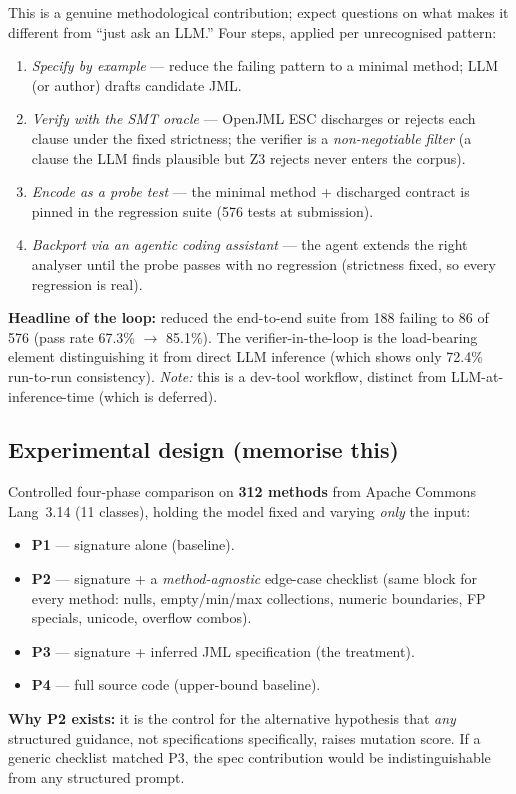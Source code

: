 \documentclass[11pt]{article}
\begin{document}
This is a genuine methodological contribution; expect questions on what makes
it different from ``just ask an LLM.'' Four steps, applied per unrecognised
pattern:
\begin{enumerate}[leftmargin=1.6em,itemsep=0.05em]
  \item \emph{Specify by example} --- reduce the failing pattern to a minimal
        method; LLM (or author) drafts candidate JML.
  \item \emph{Verify with the SMT oracle} --- OpenJML ESC discharges or
        rejects each clause under the fixed strictness; the verifier is a
        \emph{non-negotiable filter} (a clause the LLM finds plausible but Z3
        rejects never enters the corpus).
  \item \emph{Encode as a probe test} --- the minimal method + discharged
        contract is pinned in the regression suite (576 tests at submission).
  \item \emph{Backport via an agentic coding assistant} --- the agent extends
        the right analyser until the probe passes with no regression (strictness
        fixed, so every regression is real).
\end{enumerate}
\textbf{Headline of the loop:} reduced the end-to-end suite from 188 failing
to 86 of 576 (pass rate 67.3\% $\to$ 85.1\%). The verifier-in-the-loop is the
load-bearing element distinguishing it from direct LLM inference (which shows
only 72.4\% run-to-run consistency). \emph{Note:} this is a dev-tool workflow,
distinct from LLM-at-inference-time (which is deferred).

\subsection{Experimental design (memorise this)}

Controlled four-phase comparison on \textbf{312 methods} from Apache Commons
Lang~3.14 (11 classes), holding the model fixed and varying \emph{only} the
input:
\begin{itemize}[leftmargin=1.4em,itemsep=0.05em]
  \item \textbf{P1} --- signature alone (baseline).
  \item \textbf{P2} --- signature + a \emph{method-agnostic} edge-case
        checklist (same block for every method: nulls, empty/min/max
        collections, numeric boundaries, FP specials, unicode, overflow
        combos).
  \item \textbf{P3} --- signature + inferred JML specification (the treatment).
  \item \textbf{P4} --- full source code (upper-bound baseline).
\end{itemize}
\textbf{Why P2 exists:} it is the control for the alternative hypothesis that
\emph{any} structured guidance, not specifications specifically, raises
mutation score. If a generic checklist matched P3, the spec contribution would
be indistinguishable from any structured prompt.
\end{document}
